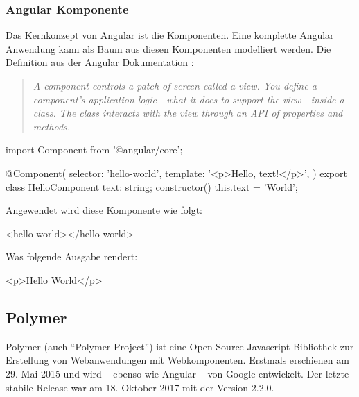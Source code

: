 \subsubsection{Angular Komponente}
Das Kernkonzept von Angular ist die Komponenten. Eine komplette Angular Anwendung kann als Baum aus diesen Komponenten modelliert werden.
Die Definition aus der Angular Dokumentation \cite{angular-component}: 
\begin{quote}
	\begin{english}
		\textit{A component controls a patch of screen called a view. You define a component's application logic—what it does to support the view—inside a class. The class interacts with the view through an API of properties and methods.}
	\end{english}
\end{quote}

\begin{JsCode}
	import { Component } from '@angular/core';
	
	@Component({
		selector: 'hello-world',
		template: '<p>Hello, {{text}}!</p>',
	})
	export class HelloComponent {
		text: string;
		constructor() {
			this.text = 'World';
		}
	}
\end{JsCode}
Angewendet wird diese Komponente wie folgt:
\begin{JsCode}[numbers=none]
	<hello-world></hello-world>
\end{JsCode}
Was folgende Ausgabe rendert:
\begin{JsCode}Hello World</p>
\end{JsCode}

\subsection{Polymer }
Polymer (auch "`Polymer-Project"') ist eine Open Source Javascript-Bibliothek zur Erstellung von Webanwendungen mit Webkomponenten. Erstmals erschienen am 29. Mai 2015 und  wird -- ebenso wie Angular -- von Google entwickelt. Der letzte stabile Release war am 18. Oktober 2017 mit der Version 2.2.0.\\

